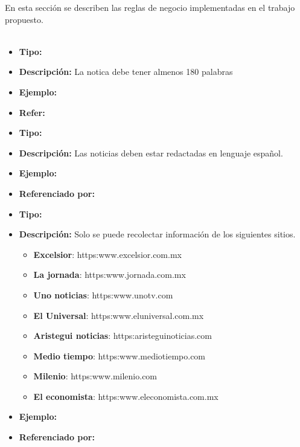 

En esta sección se describen las reglas de negocio implementadas en el trabajo propuesto.\\\\
\begin{itemize}
  \item \textbf{Tipo:}  
  \item \textbf{Descripción:}  La notica debe tener almenos 180 palabras
  \item \textbf{Ejemplo:}
  \item \textbf{Refer:}
\end{itemize}

\begin{itemize}
  \item \textbf{Tipo:}  
  \item \textbf{Descripción:} Las noticias deben estar redactadas en lenguaje español.
  \item \textbf{Ejemplo:}
  \item \textbf{Referenciado por:}  \\
\end{itemize}

\begin{itemize}
  \item \textbf{Tipo:}  
  \item \textbf{Descripción:} Solo se puede recolectar información de los siguientes sitios.\\

  \begin{itemize}

    \item \textbf{Excelsior}: https:\/\/www.excelsior.com.mx
    \item \textbf{La jornada}: https:\/\/www.jornada.com.mx
    \item \textbf{Uno noticias}: https:\/\/www.unotv.com
    \item \textbf{El Universal}: https:\/\/www.eluniversal.com.mx
    \item \textbf{Aristegui noticias}: https:\/\/aristeguinoticias.com
    \item \textbf{Medio tiempo}: https:\/\/www.mediotiempo.com
    \item \textbf{Milenio}: https:\/\/www.milenio.com 
    \item \textbf{El economista}: https:\/\/www.eleconomista.com.mx

  \end{itemize} 
  \item \textbf{Ejemplo:}
  \item \textbf{Referenciado por:}  \\
\end{itemize}


